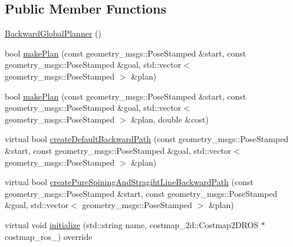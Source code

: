 \subsection*{Public Member Functions}
\begin{DoxyCompactItemize}
\item 
\hyperlink{classbackward__global__planner_1_1BackwardGlobalPlanner_a48d3b3dce0048508b0cbaf399102803f}{Backward\-Global\-Planner} ()
\item 
bool \hyperlink{classbackward__global__planner_1_1BackwardGlobalPlanner_a39f2e0d5090f0776942d7cd68eecbde1}{make\-Plan} (const geometry\-\_\-msgs\-::\-Pose\-Stamped \&start, const geometry\-\_\-msgs\-::\-Pose\-Stamped \&goal, std\-::vector$<$ geometry\-\_\-msgs\-::\-Pose\-Stamped $>$ \&plan)
\item 
bool \hyperlink{classbackward__global__planner_1_1BackwardGlobalPlanner_ade177af3c2a0660781f71e3c2ba0b343}{make\-Plan} (const geometry\-\_\-msgs\-::\-Pose\-Stamped \&start, const geometry\-\_\-msgs\-::\-Pose\-Stamped \&goal, std\-::vector$<$ geometry\-\_\-msgs\-::\-Pose\-Stamped $>$ \&plan, double \&cost)
\item 
virtual bool \hyperlink{classbackward__global__planner_1_1BackwardGlobalPlanner_a625dba5902c088241ab25c9fb628fd04}{create\-Default\-Backward\-Path} (const geometry\-\_\-msgs\-::\-Pose\-Stamped \&start, const geometry\-\_\-msgs\-::\-Pose\-Stamped \&goal, std\-::vector$<$ geometry\-\_\-msgs\-::\-Pose\-Stamped $>$ \&plan)
\item 
virtual bool \hyperlink{classbackward__global__planner_1_1BackwardGlobalPlanner_ad0caebe12fdd6cfe66d353bc7b772718}{create\-Pure\-Spining\-And\-Stragiht\-Line\-Backward\-Path} (const geometry\-\_\-msgs\-::\-Pose\-Stamped \&start, const geometry\-\_\-msgs\-::\-Pose\-Stamped \&goal, std\-::vector$<$ geometry\-\_\-msgs\-::\-Pose\-Stamped $>$ \&plan)
\item 
virtual void \hyperlink{classbackward__global__planner_1_1BackwardGlobalPlanner_ac0dfce1f9ba6d39a3b37ea6c99fac2ae}{initialize} (std\-::string name, costmap\-\_\-2d\-::\-Costmap2\-D\-R\-O\-S $\ast$costmap\-\_\-ros\-\_\-) override
\end{DoxyCompactItemize}


